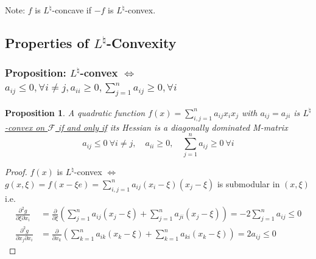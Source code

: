 \documentclass[11pt,a4paper]{article}
\newtheorem{proposition}{Proposition}
\begin{document}
Note: $f$ is $L^{\natural}$-concave if $-f$ is $L^{\natural}$-convex.


\subsection{Properties of $L^\natural$-Convexity}
\subsubsection{Proposition: $L^\natural$-convex $\Leftrightarrow$ $
a_{i j} \leq 0, \forall i \neq j, a_{i i} \geq 0, \sum_{j=1}^{n} a_{i j} \geq 0, \forall i
$}
\begin{proposition}
    A quadratic function $f(x)=\sum_{i, j=1}^{n} a_{i j} x_{i} x_{j}$ with $a_{i j}=a_{j i}$ is \underline{$L^\natural$-convex on $\mathcal{F}$ if and only if} its Hessian is a diagonally dominated M-matrix
    $$
    a_{i j} \leq 0\ \forall i \neq j,\quad a_{ii}\geq 0, \quad \sum_{j=1}^{n} a_{i j} \geq 0\ \forall i
    $$
\end{proposition}
\begin{proof}
\quad

$f(x)$ is $L^\natural$-convex $\Leftrightarrow$ $g(x,\xi)=f(x-\xi e)=\sum_{i,j=1}^na_{ij}(x_i-\xi)(x_j-\xi)$ is submodular in $(x,\xi)$ i.e.
\begin{equation}
    \begin{aligned}
        \frac{\partial^2 g}{\partial \xi\partial x_i}&=\frac{\partial}{\partial \xi}(\sum_{j=1}^na_{ij}(x_j-\xi)+\sum_{j=1}^na_{ji}(x_j-\xi))=-2\sum_{j=1}^na_{ij}\leq 0\\
        \frac{\partial^2 g}{\partial x_j\partial x_i}&=\frac{\partial}{\partial x_k}(\sum_{k=1}^na_{ik}(x_k-\xi)+\sum_{k=1}^na_{ki}(x_k-\xi))=2a_{ij}\leq 0
    \end{aligned}
    \nonumber
\end{equation}

\end{proof}
\end{document}
